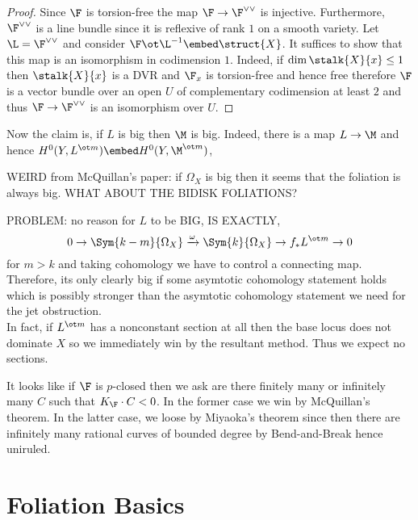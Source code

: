 \documentclass[12pt]{article}
\begin{document}
\begin{proof}
Since $\F$ is torsion-free the map $\F \to \F^{\vee \vee}$ is injective. Furthermore, $\F^{\vee \vee}$ is a line bundle since it is reflexive of rank $1$ on a smooth variety. Let $\L = \F^{\vee \vee}$ and consider $\F \ot \L^{-1} \embed \struct{X}$. It suffices to show that this map is an isomorphism in codimension $1$. Indeed, if $\dim{\stalk{X}{x}} \le 1$ then $\stalk{X}{x}$ is a DVR and $\F_x$ is torsion-free and hence free therefore $\F$ is a vector bundle over an open $U$ of complementary codimension at least $2$ and thus $\F \to \F^{\vee \vee}$ is an isomorphism over $U$. 
\end{proof}


Now the claim is, if $L$ is big then $\M$ is big. Indeed, there is a map $L \to \M$ and hence $H^0(Y, L^{\ot m}) \embed H^0(Y, \M^{\ot m})$, 


WEIRD from McQuillan's paper: if $\Omega_X$ is big then it seems that the foliation is always big. WHAT ABOUT THE BIDISK FOLIATIONS?

PROBLEM: no reason for $L$ to be BIG, IS EXACTLY,
\[ 0 \to \Sym{k-m}{\Omega_X} \xrightarrow{\omega} \Sym{k}{\Omega_X} \to f_* L^{\ot m} \to 0 \]
for $m > k$ and taking cohomology we have to control a connecting map. Therefore, its only clearly big if some asymtotic cohomology statement holds which is possibly stronger than the asymtotic cohomology statement we need for the jet obstruction. 
\bigskip\\
In fact, if $L^{\ot m}$ has a nonconstant section at all then the base locus does not dominate $X$ so we immediately win by the resultant method. Thus we expect no sections. 


It looks like if $\F$ is $p$-closed then we ask are there finitely many or infinitely many $C$ such that $K_{\F} \cdot C < 0$. In the former case we win by McQuillan's theorem. In the latter case, we loose by Miyaoka's theorem since then there are infinitely many rational curves of bounded degree by Bend-and-Break hence uniruled. 

\section{Foliation Basics}
\end{document}
